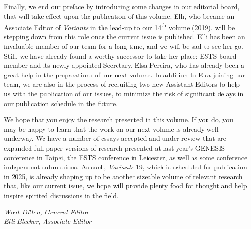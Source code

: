 Finally, we end our preface by introducing some changes in our editorial board, that will take effect upon the publication of this volume. Elli, who became an Associate Editor of \textit{Variants} in the lead-up to our 14\textsuperscript{th} volume (2019), will be stepping down from this role once the current issue is published. Elli has been an invaluable member of our team for a long time, and we will be sad to see her go. Still, we have already found a worthy successor to take her place: ESTS board member and its newly appointed Secretary, Elsa Pereira, who has already been a great help in the preparations of our next volume. In addition to Elsa joining our team, we are also in the process of recruiting two new Assistant Editors to help us with the publication of our issues, to minimize the risk of significant delays in our publication schedule in the future. 

We hope that you enjoy the research presented in this volume. If you do, you may be happy to learn that the work on our next volume is already well underway. We have a number of essays accepted and under review that are expanded full-paper versions of research presented at last year's GENESIS conference in Taipei, the ESTS conference in Leicester, as well as some conference independent submissions. As such, \textit{Variants} 19, which is scheduled for publication in 2025, is already shaping up to be another sizeable volume of relevant research that, like our current issue, we hope will provide plenty food for thought and help inspire spirited discussions in the field.






\begin{flushright}
\emph{
Wout Dillen, General Editor\\
Elli Bleeker, Associate Editor
}
\end{flushright}

